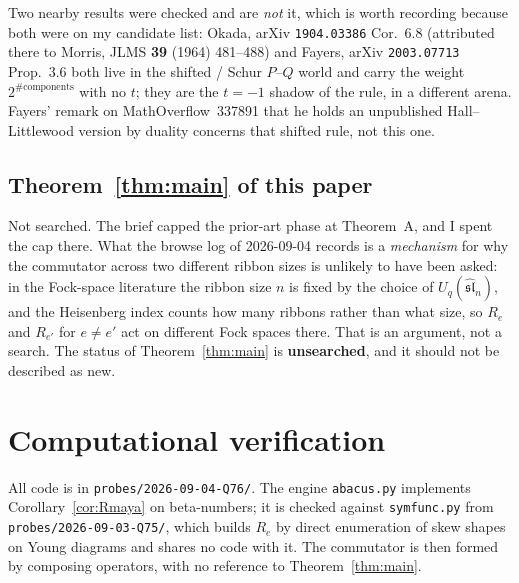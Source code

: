 \documentclass[11pt]{article}
\theoremstyle{definition}
\begin{document}
Two nearby results were checked and are \emph{not} it, which is worth recording because both were
on my candidate list: Okada, arXiv \texttt{1904.03386} Cor.~6.8 (attributed there to Morris, JLMS
\textbf{39} (1964) 481--488) and Fayers, arXiv \texttt{2003.07713} Prop.~3.6 both live in the
shifted / Schur $P$--$Q$ world and carry the weight $2^{\#\text{components}}$ with no $t$; they
are the $t=-1$ shadow of the rule, in a different arena. Fayers' remark on MathOverflow~337891
that he holds an unpublished Hall--Littlewood version by duality concerns that shifted rule, not
this one.

\subsection*{Theorem~\ref{thm:main} of this paper}

Not searched. The brief capped the prior-art phase at Theorem~A, and I spent the cap there. What
the browse log of 2026-09-04 records is a \emph{mechanism} for why the commutator across two
different ribbon sizes is unlikely to have been asked: in the Fock-space literature the ribbon
size $n$ is fixed by the choice of $U_q(\widehat{\mathfrak{sl}}_n)$, and the Heisenberg index
counts how many ribbons rather than what size, so $R_e$ and $R_{e'}$ for $e\ne e'$ act on
different Fock spaces there. That is an argument, not a search. The status of
Theorem~\ref{thm:main} is \textbf{unsearched}, and it should not be described as new.

\section{Computational verification}\label{sec:comp}

All code is in \texttt{probes/2026-09-04-Q76/}. The engine \texttt{abacus.py} implements
Corollary~\ref{cor:Rmaya} on beta-numbers; it is checked against \texttt{symfunc.py} from
\texttt{probes/2026-09-03-Q75/}, which builds $R_e$ by direct enumeration of skew shapes on Young
diagrams and shares no code with it. The commutator is then formed by composing operators, with
no reference to Theorem~\ref{thm:main}.
\end{document}
